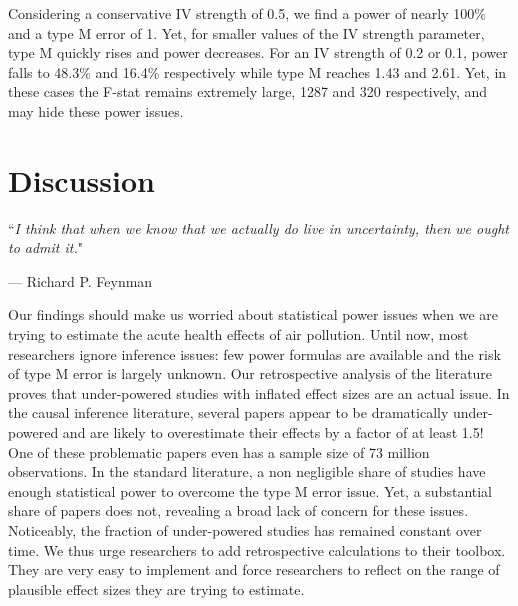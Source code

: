 \documentclass[12pt]{article}
\begin{document}
            Considering a conservative IV strength of 0.5, we find a power of nearly 100\% and a type M error of 1. Yet, for smaller values of the IV strength parameter, type M quickly rises and power decreases. For an IV strength of 0.2 or 0.1, power falls to 48.3\% and 16.4\%  respectively while type M reaches 1.43 and 2.61. Yet, in these cases the F-stat remains extremely large, 1287 and 320 respectively, and may hide these power issues. 





\section{Discussion}

\epigraph{``\textit{I think that when we know that we actually do live in uncertainty, then we ought to admit it.}"}{--- Richard P. Feynman}


Our findings should make us worried about statistical power issues when we are trying to estimate the acute health effects of air pollution. Until now, most researchers ignore inference issues: few power formulas are available and the risk of type M error is largely unknown. Our retrospective analysis of the literature proves that under-powered studies with inflated effect sizes are an actual issue. In the causal inference literature, several papers appear to be dramatically under-powered and are likely to overestimate their effects by a factor of at least 1.5! One of these problematic papers even has a sample size of 73 million observations. In the standard literature, a non negligible share of studies have enough statistical power to overcome the type M error issue. Yet, a substantial share of papers does not, revealing a broad lack of concern for these issues. Noticeably, the fraction of under-powered studies has remained constant over time. We thus urge researchers to add retrospective calculations to their toolbox. They are very easy to implement and force researchers to reflect on the range of plausible effect sizes they are trying to estimate.
\end{document}
